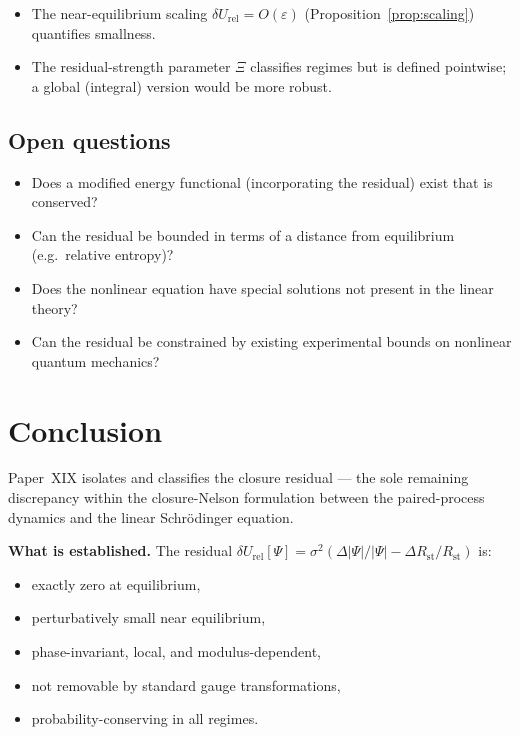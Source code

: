 \documentclass[12pt]{article}
\newcommand{\Rst}{R_{\mathrm{st}}}
\newcommand{\dUrel}{\delta U_{\mathrm{rel}}}
\begin{document}
\begin{itemize}
    \item The near-equilibrium scaling $\dUrel = O(\varepsilon)$ (Proposition~\ref{prop:scaling}) quantifies smallness.
    \item The residual-strength parameter $\Xi$ classifies regimes but is defined pointwise; a global (integral) version would be more robust.
\end{itemize}

\subsection{Open questions}

\begin{itemize}
    \item Does a modified energy functional (incorporating the residual) exist that is conserved?
    \item Can the residual be bounded in terms of a distance from equilibrium (e.g.\ relative entropy)?
    \item Does the nonlinear equation have special solutions not present in the linear theory?
    \item Can the residual be constrained by existing experimental bounds on nonlinear quantum mechanics?
\end{itemize}

\section{Conclusion}\label{sec:conclusion}

Paper~XIX isolates and classifies the closure residual --- the sole remaining discrepancy within the closure-Nelson formulation between the paired-process dynamics and the linear Schr\"odinger equation.

\textbf{What is established.} The residual $\dUrel[\Psi] = \sigma^2(\Delta|\Psi|/|\Psi| - \Delta\Rst/\Rst)$ is:
\begin{itemize}
    \item exactly zero at equilibrium,
    \item perturbatively small near equilibrium,
    \item phase-invariant, local, and modulus-dependent,
    \item not removable by standard gauge transformations,
    \item probability-conserving in all regimes.
\end{itemize}
\end{document}
